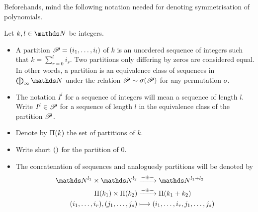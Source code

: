 Beforehands, mind the following notation needed for denoting
symmetrisation of polynomials.
\begin{Def}
  Let $k,l\in\Nat$ be integers.
  \begin{itemize}
  \item
    A partition $\mathscr{P}=(i_1,\dotsc,i_l)$ of $k$ is an unordered sequence
    of integers such that $k=\sum_{r=0}^{l}i_r$.
    Two partitions only differing by zeros are considered equal.
    In other words, a partition is an equivalence class of sequences in
    $\bigoplus_\infty\Nat$ under the relation $\mathscr{P}\sim\sigma(\mathscr{P})$
    for any permutation $\sigma$.
  \item
    The notation $I^l$ for a sequence of integers will mean a sequence
    of length $l$. Write $I^l\in\mathscr{P}$ for a sequence of length
    $l$ in the equivalence class of the partition $\mathscr{P}$. 
  \item
    Denote by $\Pi({k})$ the set of partitions of $k$.
  \item
    Write short $()$ for the partition of $0$.
  \item The concatenation of sequences and analoguesly partitions will
    be denoted by
    \begin{align*}
      \Nat^{l_1} \times \Nat^{l_2}
      &\xrightarrow{-\concat-}
        \Nat^{l_1+l_2}
      \\
      \PartitionsOf{k_1} \times \PartitionsOf{k_2}
      &\xrightarrow{-\concat-}
        \PartitionsOf{k_1+k_2}
      \\
      (i_1,\dotsc,i_r), (j_1,\dotsc,j_s)
      &\longmapsto
        (i_1,\dotsc,i_r,j_1,\dotsc,j_s)
    \end{align*}
  \end{itemize}
\end{Def}

